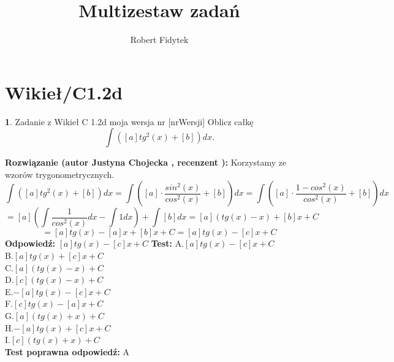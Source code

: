 \documentclass[12pt, a4paper]{article}
\title{Multizestaw zadań}
\author{Robert Fidytek}
\date{}
\theoremstyle{definition} %
\newtheorem{zad}{}
\newcommand{\kategoria}[1]{\section{#1}} %
\newcommand{\zadStart}[1]{\begin{zad}#1\newline} %
\newcommand{\zadStop}{\end{zad}}   %
\newcommand{\rozwStart}[2]{\noindent \textbf{Rozwiązanie (autor #1 , recenzent #2): }\newline} %
\newcommand{\rozwStop}{\newline}                                            %
\newcommand{\odpStart}{\noindent \textbf{Odpowiedź:}\newline}    %
\newcommand{\odpStop}{\newline}                                             %
\newcommand{\testStart}{\noindent \textbf{Test:}\newline} %
\newcommand{\testStop}{\newline} %
\newcommand{\kluczStart}{\noindent \textbf{Test poprawna odpowiedź:}\newline} %
\newcommand{\kluczStop}{\newline} %
\begin{document}
\maketitle
\kategoria{Wikieł/C1.2d}
\zadStart{Zadanie z Wikieł C 1.2d moja wersja nr [nrWersji]}
Oblicz całkę $$\int ([a]tg^{2}(x)+[b]) dx.$$
\zadStop
\rozwStart{Justyna Chojecka}{}
Korzystamy ze wzorów trygonometrycznych.
$$\int ([a]tg^{2}(x)+[b]) dx=\int \left([a]\cdot\frac{sin^{2}(x)}{cos^{2}(x)}+[b]\right)dx=\int \left([a]\cdot\frac{1-cos^{2}(x)}{cos^{2}(x)}+[b]\right)dx$$$$=[a]\left(\int\frac{1}{cos^{2}(x)}dx-\int 1dx\right)+\int [b]dx=[a]\left(tg(x)-x\right)+[b]x+C$$$$=[a]tg(x)-[a]x+[b]x+C=[a]tg(x)-[c]x+C$$
\rozwStop
\odpStart
$[a]tg(x)-[c]x+C$
\odpStop
\testStart
A.$[a]tg(x)-[c]x+C$\\
B.$[a]tg(x)+[c]x+C$\\
C.$[a](tg(x)-x)+C$\\
D.$[c](tg(x)-x)+C$\\
E.$-[a]tg(x)-[c]x+C$\\
F.$[c]tg(x)-[a]x+C$\\
G.$[a](tg(x)+x)+C$\\
H.$-[a]tg(x)+[c]x+C$\\
I.$[c](tg(x)+x)+C$\\
\testStop
\kluczStart
A
\kluczStop
\end{document}
